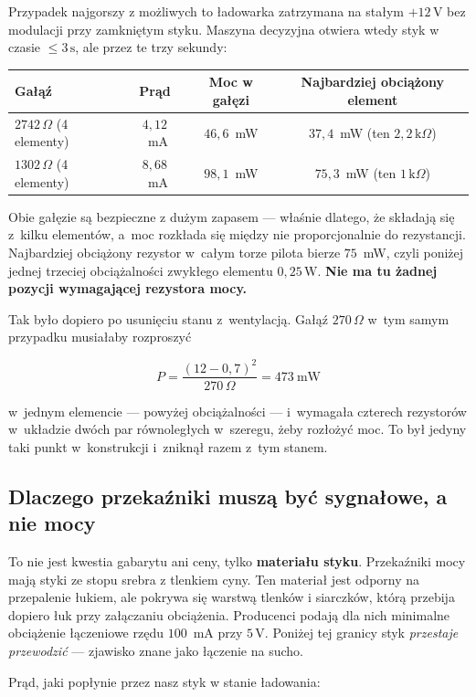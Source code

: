 \documentclass[a4paper,11pt]{article}
\newcommand{\ohm}{\,\Omega}
\newcommand{\kohm}{\,\mathrm{k}\Omega}
\newcommand{\volt}{\,\mathrm{V}}
\newcommand{\watt}{\,\mathrm{W}}
\newcommand{\sek}{\,\mathrm{s}}
\begin{document}
Przypadek najgorszy z możliwych to ładowarka zatrzymana na stałym $+12\volt$ bez
modulacji przy zamkniętym styku. Maszyna decyzyjna otwiera wtedy styk w czasie
$\le3\sek$, ale przez te trzy sekundy:

\begin{center}
\begin{tabular}{lccc}
\toprule
Gałąź & Prąd & Moc w gałęzi & Najbardziej obciążony element \\
\midrule
$2742\ohm$ (4 elementy) & $4{,}12$~mA & $46{,}6$~mW & $37{,}4$~mW (ten $2{,}2\kohm$) \\
$1302\ohm$ (4 elementy) & $8{,}68$~mA & $98{,}1$~mW & $75{,}3$~mW (ten $1\kohm$) \\
\bottomrule
\end{tabular}
\end{center}

Obie gałęzie są bezpieczne z dużym zapasem --- właśnie dlatego, że składają się
z~kilku elementów, a~moc rozkłada się między nie proporcjonalnie do rezystancji.
Najbardziej obciążony rezystor w~całym torze pilota bierze $75$~mW, czyli poniżej
jednej trzeciej obciążalności zwykłego elementu $0{,}25\watt$. \textbf{Nie ma tu
żadnej pozycji wymagającej rezystora mocy.}

Tak było dopiero po usunięciu stanu z~wentylacją. Gałąź $270\ohm$ w~tym samym
przypadku musiałaby rozproszyć

\[
P=\frac{(12-0{,}7)^2}{270\ohm}=473\ \mathrm{mW}
\]

w~jednym elemencie --- powyżej obciążalności --- i~wymagała czterech rezystorów
w~układzie dwóch par równoległych w~szeregu, żeby rozłożyć moc. To był jedyny taki
punkt w~konstrukcji i~zniknął razem z~tym stanem.

\subsection{Dlaczego przekaźniki muszą być sygnałowe, a nie mocy}
\label{sec:przekazniki}

To nie jest kwestia gabarytu ani ceny, tylko \textbf{materiału styku}. Przekaźniki
mocy mają styki ze stopu srebra z tlenkiem cyny. Ten materiał jest odporny na
przepalenie łukiem, ale pokrywa się warstwą tlenków i siarczków, którą przebija
dopiero łuk przy załączaniu obciążenia. Producenci podają dla nich minimalne
obciążenie łączeniowe rzędu $100$~mA przy $5\volt$. Poniżej tej granicy styk
\emph{przestaje przewodzić} --- zjawisko znane jako łączenie na sucho.

Prąd, jaki popłynie przez nasz styk w stanie ładowania:
\end{document}
